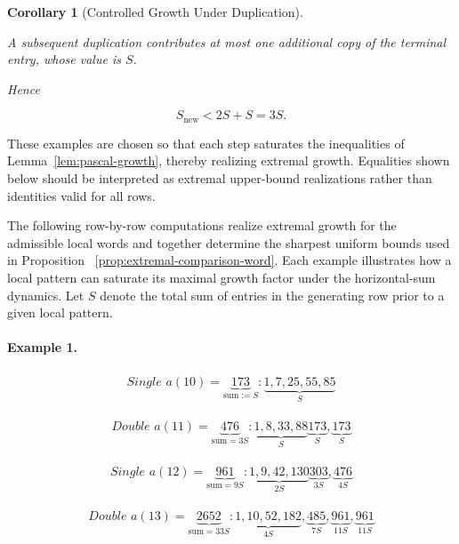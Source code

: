 \documentclass[12pt, oneside]{article}
\numberwithin{equation}{section}
\theoremstyle{definition}
\theoremstyle{plain}
\newtheorem{corollary}[theorem]{Corollary}
\theoremstyle{remark}
\begin{document}
\begin{corollary}[Controlled Growth Under Duplication]
\label{lem:controlled-growth-under-duplication}

A subsequent duplication contributes at most one additional copy of the
terminal entry, whose value is $S$.

Hence

\[
S_{\mathrm{new}}
<
2S+S
=
3S.
\]

\end{corollary}

These examples are chosen so that each step saturates the inequalities of
Lemma~\ref{lem:pascal-growth}, thereby realizing extremal growth. Equalities
shown below should be interpreted as extremal upper-bound realizations rather than
identities valid for all rows.

The following row-by-row computations realize extremal growth for the admissible
local words and together determine the sharpest uniform bounds used in
Proposition ~\ref{prop:extremal-comparison-word}.  Each example illustrates how a local pattern
can saturate its maximal growth factor under the horizontal-sum dynamics.  Let $S$
denote the total sum of entries in the generating row prior to a given local pattern.

\paragraph{Example 1.}
\[
\begin{array}{l}
\textit{Single } a(10) = \underbrace{173}_{\text{sum} := S}:
\underbrace{1,7,25,55,85}_{S}
\end{array}
\]

\[
\begin{array}{l}
\textit{Double } a(11) = \underbrace{476}_{\text{sum} = 3S}:
\underbrace{1,8,33,88}_{S}
\underbrace{173}_{S},
\underbrace{173}_{S}
\end{array}
\]

\[
\begin{array}{l}
\textit{Single } a(12) = \underbrace{961}_{\text{sum} = 9S}:
\underbrace{1,9,42,130}_{2S}
\underbrace{303}_{3S},
\underbrace{476}_{4S}
\end{array}
\]

\[
\begin{array}{l}
\textit{Double } a(13) = \underbrace{2652}_{\text{sum} = 33S}:
\underbrace{1,10,52,182}_{4S},
\underbrace{485}_{7S},
\underbrace{961}_{11S},
\underbrace{961}_{11S}
\end{array}
\]
\end{document}
